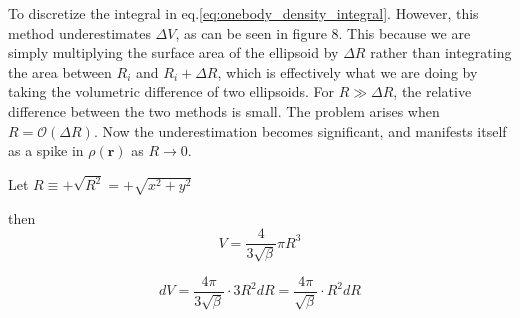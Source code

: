 \documentclass[
    a4paper, aps, twocolumn, floatfix, superscriptaddress,
    nofootinbib]{revtex4-1}
\begin{document}
\begin{appendices}
To discretize the integral in eq.\eqref{eq:onebody_density_integral}. However, this method underestimates $\Delta V$, as can be seen in figure 8. This because we are simply multiplying the surface area of the ellipsoid by $\Delta R$ rather than integrating the area between $R_i$ and $R_i+\Delta R$, which is effectively what we are  doing by taking the volumetric difference of two ellipsoids. For $R \gg \Delta R$, the relative difference between the two methods is small. The problem arises when $R=\mathcal{O}(\Delta R)$. Now the underestimation becomes significant, and manifests itself as a spike in $\rho(\boldsymbol{r})$ as $R\rightarrow 0$. 
\begin{figure}[H]
\makebox[0.5\textwidth][c]{}%
 \caption{}
 \label{fig:8}
\end{figure}






\iffalse
Let $R \equiv +\sqrt{R^2}=+\sqrt{x^2+y^2}$

then 
\begin{equation}
    V = \frac{4}{3\sqrt{\beta}}\pi R^3
\end{equation}

\begin{equation}
    dV = \frac{4\pi}{3\sqrt{\beta}}\cdot 3 R^2 dR =\frac{4\pi}{\sqrt{\beta}}\cdot R^2 dR  
\end{equation}


\end{appendices}
\end{document}
